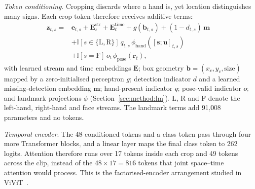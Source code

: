 \documentclass[pdflatex,sn-mathphys-num,twocolumn,lineno]{sn-jnl}
\theoremstyle{thmstyleone}%
\begin{document}
\textit{Token conditioning.} Cropping discards where a hand is, yet location distinguishes many signs. Each crop token therefore receives additive terms:
\begin{equation}
\begin{aligned}
\mathbf{z}_{t,s}={}&\mathbf{e}_{t,s}+\mathbf{E}^{\mathrm{str}}_{s}+\mathbf{E}^{\mathrm{time}}_{t}+g(\mathbf{b}_{t,s})+(1-d_{t,s})\,\mathbf{m}\\
&+\mathbb{I}[s\in\{\mathrm{L},\mathrm{R}\}]\,q_{t,s}\,\phi_{\mathrm{hand}}([\mathbf{s};\mathbf{u}]_{t,s})\\
&+\mathbb{I}[s=\mathrm{F}]\,o_t\,\phi_{\mathrm{pose}}(\mathbf{r}_t),
\end{aligned}\label{eq:token}
\end{equation}
with learned stream and time embeddings $\mathbf{E}$; box geometry $\mathbf{b}=(x_c,y_c,\text{size})$ mapped by a zero-initialised perceptron $g$; detection indicator $d$ and a learned missing-detection embedding $\mathbf{m}$; hand-present indicator $q$; pose-valid indicator $o$; and landmark projections $\phi$ (Section~\ref{sec:method:lm}). L, R and F denote the left-hand, right-hand and face streams. The landmark terms add 91,008 parameters and no tokens.

\textit{Temporal encoder.} The 48 conditioned tokens and a class token pass through four more Transformer blocks, and a linear layer maps the final class token to 262 logits. Attention therefore runs over 17 tokens inside each crop and 49 tokens across the clip, instead of the $48\times17=816$ tokens that joint space--time attention would process. This is the factorised-encoder arrangement studied in ViViT~\cite{arnab2021vivit}.
\end{document}

